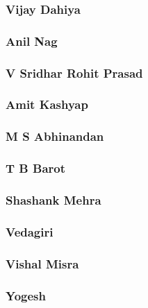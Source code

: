 \documentclass{article}
\begin{document}
\subsubsection{Vijay Dahiya}


\subsubsection{Anil Nag}


\subsubsection{V Sridhar Rohit Prasad}


\subsubsection{Amit Kashyap}


\subsubsection{M S Abhinandan}


\subsubsection{T B Barot}


\subsubsection{Shashank Mehra}


\subsubsection{Vedagiri}


\subsubsection{Vishal Misra}


\subsubsection{Yogesh}

\end{document}
